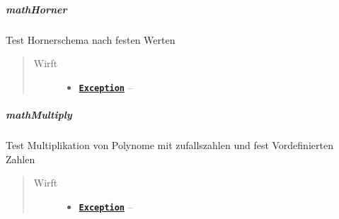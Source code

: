 \documentclass[letterpaper,10pt,ngerman]{sphinxmanual}
\begin{document}
\subparagraph{mathHorner}
\label{com/linuxluigi/polynomial/test/PolynomialListTest:mathhorner}

\begin{fulllineitems}
\label{com/linuxluigi/polynomial/test/PolynomialListTest:com.linuxluigi.polynomial.test.PolynomialListTest.mathHorner()}
Test Hornerschema nach festen Werten
\begin{quote}\begin{description}
\item[{Wirft}] \leavevmode\begin{itemize}
\item {} 
\href{http://docs.oracle.com/javase/8/docs/api/java/lang/Exception.html}{\textbf{\texttt{Exception}}} -- 

\end{itemize}

\end{description}\end{quote}

\end{fulllineitems}



\subparagraph{mathMultiply}
\label{com/linuxluigi/polynomial/test/PolynomialListTest:mathmultiply}

\begin{fulllineitems}
\label{com/linuxluigi/polynomial/test/PolynomialListTest:com.linuxluigi.polynomial.test.PolynomialListTest.mathMultiply()}
Test Multiplikation von Polynome mit zufallszahlen und fest Vordefinierten Zahlen
\begin{quote}\begin{description}
\item[{Wirft}] \leavevmode\begin{itemize}
\item {} 
\href{http://docs.oracle.com/javase/8/docs/api/java/lang/Exception.html}{\textbf{\texttt{Exception}}} -- 

\end{itemize}

\end{description}\end{quote}

\end{fulllineitems}
\end{document}
